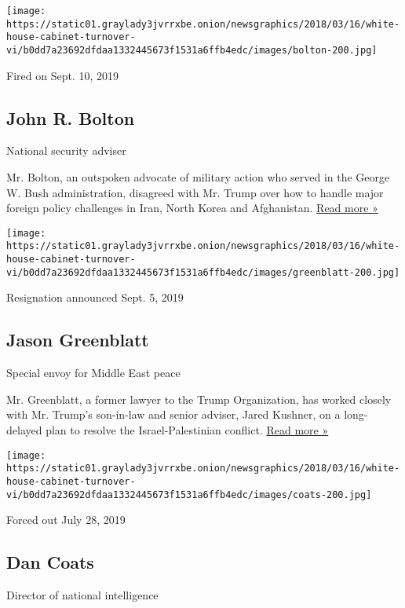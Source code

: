 \texttt{[image: https://static01.graylady3jvrrxbe.onion/newsgraphics/2018/03/16/white-house-cabinet-turnover-vi/b0dd7a23692dfdaa1332445673f1531a6ffb4edc/images/bolton-200.jpg]}

Fired on Sept. 10, 2019

\hypertarget{john-r-bolton}{%
\subsection{John R. Bolton}\label{john-r-bolton}}

National security adviser

Mr. Bolton, an outspoken advocate of military action who served in the
George W. Bush administration, disagreed with Mr. Trump over how to
handle major foreign policy challenges in Iran, North Korea and
Afghanistan.
\href{https://www.nytimes3xbfgragh.onion/2019/09/10/us/politics/john-bolton-national-security-adviser-trump.html}{Read
more »}

\texttt{[image: https://static01.graylady3jvrrxbe.onion/newsgraphics/2018/03/16/white-house-cabinet-turnover-vi/b0dd7a23692dfdaa1332445673f1531a6ffb4edc/images/greenblatt-200.jpg]}

Resignation announced Sept. 5, 2019

\hypertarget{jason-greenblatt}{%
\subsection{Jason Greenblatt}\label{jason-greenblatt}}

Special envoy for Middle East peace

Mr. Greenblatt, a former lawyer to the Trump Organization, has worked
closely with Mr. Trump's son-in-law and senior adviser, Jared Kushner,
on a long-delayed plan to resolve the Israel-Palestinian conflict.
\href{https://www.nytimes3xbfgragh.onion/2019/09/05/us/politics/jason-greenblatt-middle-east-peace.html}{Read
more »}

\texttt{[image: https://static01.graylady3jvrrxbe.onion/newsgraphics/2018/03/16/white-house-cabinet-turnover-vi/b0dd7a23692dfdaa1332445673f1531a6ffb4edc/images/coats-200.jpg]}

Forced out July 28, 2019

\hypertarget{dan-coats}{%
\subsection{Dan Coats}\label{dan-coats}}

Director of national intelligence


